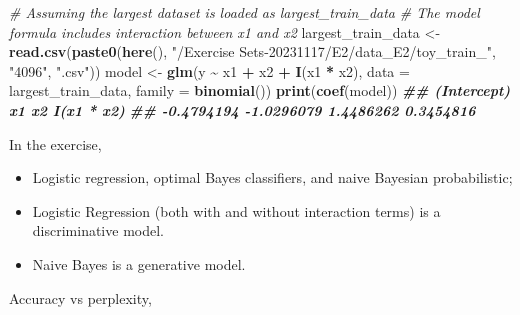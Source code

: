 \documentclass[
]{article}
\newenvironment{Shaded}{\begin{snugshade}}{\end{snugshade}}
\newcommand{\AttributeTok}[1]{\textcolor[rgb]{0.13,0.29,0.53}{#1}}
\newcommand{\CommentTok}[1]{\textcolor[rgb]{0.56,0.35,0.01}{\textit{#1}}}
\newcommand{\DocumentationTok}[1]{\textcolor[rgb]{0.56,0.35,0.01}{\textbf{\textit{#1}}}}
\newcommand{\FunctionTok}[1]{\textcolor[rgb]{0.13,0.29,0.53}{\textbf{#1}}}
\newcommand{\NormalTok}[1]{#1}
\newcommand{\OtherTok}[1]{\textcolor[rgb]{0.56,0.35,0.01}{#1}}
\newcommand{\SpecialCharTok}[1]{\textcolor[rgb]{0.81,0.36,0.00}{\textbf{#1}}}
\newcommand{\StringTok}[1]{\textcolor[rgb]{0.31,0.60,0.02}{#1}}
\begin{document}
\begin{Shaded}
\begin{Highlighting}[]
\CommentTok{\# Assuming the largest dataset is loaded as largest\_train\_data}
\CommentTok{\# The model formula includes interaction between x1 and x2}
\NormalTok{largest\_train\_data }\OtherTok{\textless{}{-}} \FunctionTok{read.csv}\NormalTok{(}\FunctionTok{paste0}\NormalTok{(}\FunctionTok{here}\NormalTok{(), }\StringTok{"/Exercise Sets{-}20231117/E2/data\_E2/toy\_train\_"}\NormalTok{, }\StringTok{"4096"}\NormalTok{, }\StringTok{".csv"}\NormalTok{))}
\NormalTok{model }\OtherTok{\textless{}{-}} \FunctionTok{glm}\NormalTok{(y }\SpecialCharTok{\textasciitilde{}}\NormalTok{ x1 }\SpecialCharTok{+}\NormalTok{ x2 }\SpecialCharTok{+} \FunctionTok{I}\NormalTok{(x1 }\SpecialCharTok{*}\NormalTok{ x2), }\AttributeTok{data =}\NormalTok{ largest\_train\_data, }\AttributeTok{family =} \FunctionTok{binomial}\NormalTok{())}
\FunctionTok{print}\NormalTok{(}\FunctionTok{coef}\NormalTok{(model))}
\DocumentationTok{\#\# (Intercept)          x1          x2  I(x1 * x2) }
\DocumentationTok{\#\#  {-}0.4794194  {-}1.0296079   1.4486262   0.3454816}
\end{Highlighting}
\end{Shaded}

In the exercise,

\begin{itemize}
\item
  Logistic regression, optimal Bayes classifiers, and naive Bayesian
  probabilistic;
\item
  Logistic Regression (both with and without interaction terms) is a
  discriminative model.
\item
  Naive Bayes is a generative model.
\end{itemize}

Accuracy vs perplexity,
\end{document}

